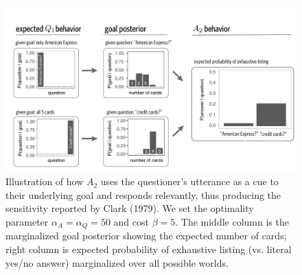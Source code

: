 \documentclass[11pt, floatsintext]{apa6}
\begin{document}


\begin{figure}[t]
\begin{center}
\includegraphics[scale=.5]{simulations/clarkExampleFig}
\end{center}
\caption{Illustration of how $A_2$ uses the questioner's utterance as a cue to their underlying goal and responds relevantly, thus producing the sensitivity reported by Clark (1979). We set the optimality parameter $\alpha_A = \alpha_Q = 50$ and cost $\beta = 5$. The middle column is the marginalized goal posterior showing the expected number of cards; right column is expected probability of exhaustive listing (vs. literal yes/no answer) marginalized over all possible worlds.}
\label{fig:clarkExample}
\end{figure}
\end{document}
